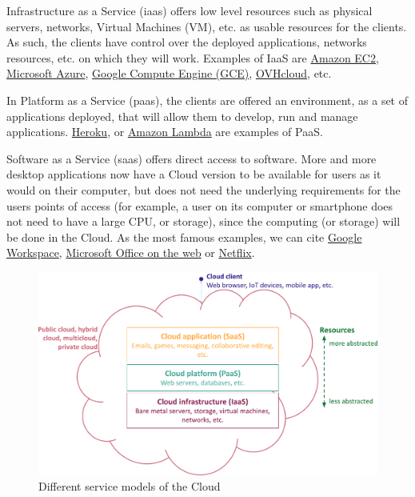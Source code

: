 \begin{description}

\item Infrastructure as a Service (\acrshort{iaas}) offers low level
  resources such as physical \glspl{server}, networks, Virtual
  Machines (VM), etc. as usable resources for the clients. As such,
  the clients have control over the deployed applications, networks
  resources, etc. on which they will work. Examples of IaaS are
  \href{https://docs.aws.amazon.com/AWSEC2/latest/UserGuide/concepts.html}{Amazon
    EC2}, \href{https://azure.microsoft.com/en-us/}{Microsoft Azure},
  \href{https://cloud.google.com/compute/}{Google Compute Engine
    (GCE)}, \href{https://www.ovhcloud.com/}{OVHcloud}, etc.

\item In Platform as a Service (\acrshort{paas}), the clients are
offered an environment, as a set of applications deployed, that will
allow them to develop, run and manage
applications. \href{https://www.heroku.com/platform}{Heroku}, or
\href{https://aws.amazon.com/lambda/}{Amazon Lambda} are examples of
PaaS.

\item Software as a Service (\acrshort{saas}) offers direct access to
software. More and more desktop applications now have a Cloud version
to be available for users as it would on their computer, but does not
need the underlying requirements for the users points of access (for
example, a user on its computer or smartphone does not need to have a
large CPU, or storage), since the computing (or storage) will be done
in the Cloud. As the most famous examples, we can cite
\href{https://workspace.google.com/}{Google Workspace},
\href{https://www.microsoft.com/en/microsoft-365/free-office-online-for-the-web}{Microsoft
Office on the web} or \href{https://www.netflix.com}{Netflix}.
\end{description}
%

\begin{figure}[htbp]
  \centering
  \includegraphics[width=.8\linewidth]{figs/pdf/CloudaaS}
  \caption{Different service models of the Cloud}
  \label{fig:cloudaas}
\end{figure}



